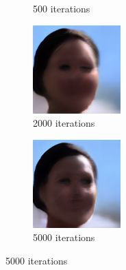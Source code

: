 \documentclass{article}
\begin{document}
\begin{figure}[h!]
\begin{subfigure}[b]{0.24\textwidth}
         \caption{500 iterations}
     \end{subfigure}
     \begin{subfigure}[b]{0.24\textwidth}
         \centering
         \includegraphics[width=\textwidth]{illustration/face_biggan_2000.png}
         \caption{2000 iterations}
     \end{subfigure}
     \begin{subfigure}[b]{0.24\textwidth}
         \centering
         \includegraphics[width=\textwidth]{illustration/face_biggan_5000.png}
         \caption{5000 iterations}
     \end{subfigure}
\end{figure}
\end{document}
